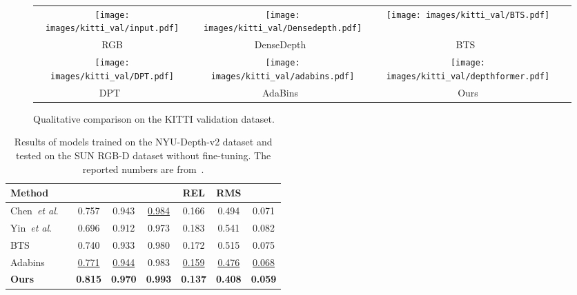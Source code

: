 \documentclass[twocolumn]{svjour3}    \pdfoutput=1
\newcommand{\etal}{\textit{et al}. }
\begin{document}
\begin{figure*}[t]
    \centering
    \footnotesize
    \begin{tabular}{@{}c@{\hspace{0.1cm}}c@{\hspace{0.1cm}}c@{\hspace{0.1cm}}c@{}}
        \texttt{[image: images/kitti\_val/input.pdf]} & 
        \texttt{[image: images/kitti\_val/Densedepth.pdf]} & 
        \texttt{[image: images/kitti\_val/BTS.pdf]} \\ 
        RGB & DenseDepth~\citep{Alhashim2018} & BTS~\citep{lee2019bts}\\
        \texttt{[image: images/kitti\_val/DPT.pdf]} & 
        \texttt{[image: images/kitti\_val/adabins.pdf]} &
        \texttt{[image: images/kitti\_val/depthformer.pdf]}\\ 
        DPT~\citep{ranftl2021dpt} & AdaBins~\citep{bhat2021adabins}& Ours \\
    \end{tabular}
    \caption{Qualitative comparison on the KITTI validation dataset.}
    \label{fig:qualitative-comparison-kitti}
 \end{figure*}

\begin{table*}[htbp]
\centering
    \begin{adjustbox}{width=0.750\linewidth,center}
        \begin{tabular}{@{}lcccccc@{}}
            \toprule
            Method &  &  &  & REL & RMS & \\ \midrule
            Chen~\etal~\citep{chen2019structure} & 0.757 & 0.943 & \underline{0.984} & 0.166 & 0.494 & 0.071\\
            Yin~\etal~\citep{yin2019enforcing} & 0.696 & 0.912 & 0.973 & 0.183 & 0.541 & 0.082\\
            BTS~\citep{lee2019bts} & 0.740 & 0.933 & 0.980 & 0.172 & 0.515 &  0.075 \\ 
            Adabins~\citep{bhat2021adabins} & \underline{0.771} & \underline{0.944} & 0.983 & \underline{0.159} & \underline{0.476} & \underline{0.068} \\ 
            \midrule
            \textbf{Ours} & \textbf{0.815} & \textbf{0.970} & \textbf{0.993} & \textbf{0.137} & \textbf{0.408} & \textbf{0.059} \\
            \bottomrule
        \end{tabular}
    \end{adjustbox}
    \caption{Results of models trained on the NYU-Depth-v2 dataset and tested on the SUN RGB-D dataset \citep{song2015sun} without fine-tuning. The reported numbers are from~\citep{bhat2021adabins}.}
    \label{tab:generalization}
\end{table*}
\end{document}
